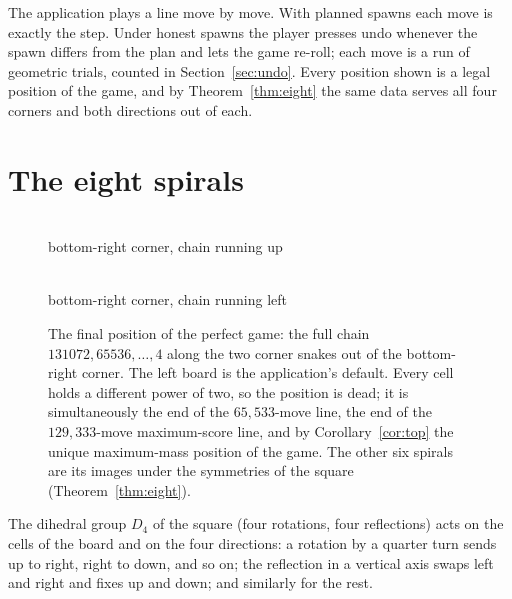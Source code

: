 \documentclass[11pt]{article}
\theoremstyle{definition}
\theoremstyle{remark}
\newcommand{\Dfour}{D_4}
\begin{document}
The application plays a line move by move. With planned spawns each move
is exactly the step. Under honest spawns the player presses undo whenever
the spawn differs from the plan and lets the game re-roll; each move is a
run of geometric trials, counted in Section~\ref{sec:undo}. Every position
shown is a legal position of the game, and by Theorem~\ref{thm:eight} the
same data serves all four corners and both directions out of each.

\section{The eight spirals}\label{sec:eight}

\begin{figure}[t]
\centering
\begin{minipage}[t]{0.47\textwidth}\centering\FigSpiralCol\\[3pt]{\small bottom-right corner, chain running up}\end{minipage}\hfill
\begin{minipage}[t]{0.47\textwidth}\centering\FigSpiralRow\\[3pt]{\small bottom-right corner, chain running left}\end{minipage}
\caption{The final position of the perfect game: the full chain
$131072,65536,\dots,4$ along the two corner snakes out of the bottom-right
corner. The left board is the application's default. Every cell holds a
different power of two, so the position is dead; it is simultaneously the
end of the $65{,}533$-move line, the end of the $129{,}333$-move
maximum-score line, and by Corollary~\ref{cor:top} the unique
maximum-mass position of the game. The other six spirals are its images
under the symmetries of the square (Theorem~\ref{thm:eight}).}
\label{fig:spiral}
\end{figure}

The dihedral group $\Dfour$ of the square (four rotations, four
reflections) acts on the cells of the board and on the four directions:
a rotation by a quarter turn sends up to right, right to down, and so on;
the reflection in a vertical axis swaps left and right and fixes up and
down; and similarly for the rest.
\end{document}

